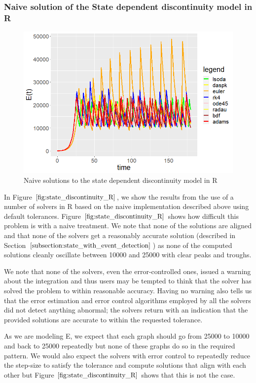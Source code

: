 \subsubsection{Naive solution of the State dependent discontinuity model in R}
\begin{figure}[H]
\centering
\includegraphics[width=0.7\linewidth]{./figures/state_discontinuity_R}
\caption{Naive solutions to the state dependent discontinuity model in R}
\label{fig:state_discontinuity_R}
\end{figure}
In Figure $\ref{fig:state_discontinuity_R}$, we show the results from the use of a number of solvers in R based on the naive implementation described above using default tolerances. Figure $\ref{fig:state_discontinuity_R}$ shows how difficult this problem is with a naive treatment. We note that none of the solutions are aligned and that none of the solvers get a reasonably accurate solution (described in Section $\ref{subsection:state_with_event_detection}$) as none of the computed solutions cleanly oscillate between 10000 and 25000 with clear peaks and troughs.

We note that none of the solvers, even the error-controlled ones, issued a warning about the integration and thus users may be tempted to think that the solver has solved the problem to within reasonable accuracy. Having no warning also tells us that the error estimation and error control algorithms employed by all the solvers did not detect anything abnormal; the solvers return with an indication that the provided solutions are accurate to within the requested tolerance.

As we are modeling E, we expect that each graph should go from 25000 to 10000 and back to 25000 repeatedly but none of these graphs do so in the required pattern. We would also expect the solvers with error control to repeatedly reduce the step-size to satisfy the tolerance and compute solutions that align with each other but Figure $\ref{fig:state_discontinuity_R}$ shows that this is not the case.

